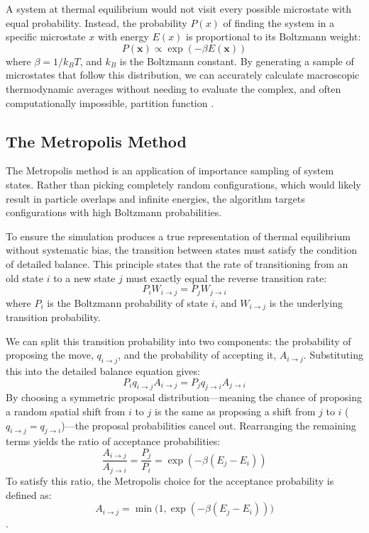 \documentclass[11pt,a4paper]{article}
\begin{document}
        A system at thermal equilibrium would not visit every possible microstate with equal probability.
        Instead, the probability $P(x)$ of finding the system in a specific microstate $x$ with energy $E(x)$ is proportional to its Boltzmann weight:
        \[
            P(\mathbf{x}) \propto \exp(-\beta E(\mathbf{x}))
        \]
        where $\beta = 1 / k_B T$, and $k_B$ is the Boltzmann constant.
        By generating a sample of microstates that follow this distribution, we can accurately calculate macroscopic thermodynamic averages without needing to evaluate the complex, and often computationally impossible, partition function \citep{Saxena16}.
        
    \subsection{The Metropolis Method}\label{sec: Metropolis}
        The Metropolis method is an application of importance sampling of system states.
        Rather than picking completely random configurations, which would likely result in particle overlaps and infinite energies, the algorithm targets configurations with high Boltzmann probabilities.

        To ensure the simulation produces a true representation of thermal equilibrium without systematic bias, the transition between states must satisfy the condition of detailed balance.
        This principle states that the rate of transitioning from an old state $i$ to a new state $j$ must exactly equal the reverse transition rate:
        \[
            P_i W_{i\to j} = P_j W_{j\to i}
        \]
        where $P_i$ is the Boltzmann probability of state $i$, and $W_{i\to j}$ is the underlying transition probability.

        We can split this transition probability into two components: the probability of proposing the move, $q_{i\to j}$, and the probability of accepting it, $A_{i\to j}$.
        Substituting this into the detailed balance equation gives:
        \[
            P_i q_{i\to j} A_{i\to j} = P_j q_{j\to i} A_{j\to i}
        \]
        By choosing a symmetric proposal distribution—meaning the chance of proposing a random spatial shift from $i$ to $j$ is the same as proposing a shift from $j$ to $i$ ($q_{i\to j} = q_{j\to i}$)—the proposal probabilities cancel out.
        Rearranging the remaining terms yields the ratio of acceptance probabilities:
        \[
            \frac{A_{i\to j}}{A_{j\to i}} = \frac{P_j}{P_i} = \exp(-\beta(E_j - E_i))
        \]
        To satisfy this ratio, the Metropolis choice for the acceptance probability is defined as:
        \[
            A_{i\to j} = \min\big(1, \exp(-\beta(E_j - E_i))\big)
        \] \citep{Landau21,Frenkel96}.
\newpage
\end{document}
